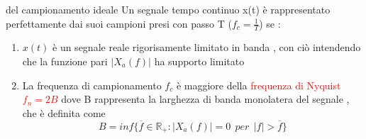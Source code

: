 \documentclass{article}
\theoremstyle{definition}
\newcommand{\R}{\mathbb{R}}
\begin{document}
	\begin{teo*}{del campionamento ideale}
	Un segnale tempo continuo x(t) è rappresentato perfettamente dai suoi campioni presi con passo T ($f_c=\frac{1}{T}$) se : 
	\begin{enumerate}
	\item $x(t)$ è un segnale reale rigorisamente limitato in banda , con ciò intendendo che la funzione pari $|X_a(f)|$ ha supporto limitato
	\item La frequenza di campionamento $f_c$ è maggiore della \textcolor{red}{frequenza di Nyquist $f_n=2B$} dove B rappresenta la larghezza di banda monolatera del segnale , che è definita come $$B=inf\{\overline{f}\in \R_+: |X_a(f)|=0 \ \ per \ \ |f|>\overline{f}\}$$
	\end{enumerate}
	\end{teo*}
 
\end{document}
